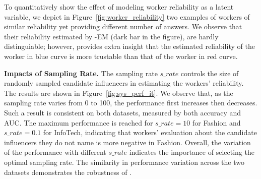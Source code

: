 To quantitatively show the effect of modeling worker reliability as a latent variable, we depict in Figure~\ref{fig:worker_reliability} two examples of workers of similar reliability yet providing different number of answers. We observe that their reliability estimated by \sys-EM (dark bar in the figure), are hardly distinguiable; however, \sys provides extra insight that the estimated reliability of the worker in blue curve is more trustable than that of the worker in red curve.




\smallskip
\noindent\textbf{Impacts of Sampling Rate.}
The sampling rate $s\_rate$ controls the size of randomly sampled candidate influencers in estimating the workers' reliability. The results are shown in Figure~\ref{fig:sys_perf_it}. We observe that, as the sampling rate varies from 0 to 100, the performance first increases then decreases. Such a result is consistent on both datasets, measured by both accuracy and AUC. The maximum performance is reached for $s\_rate= 10$ for Fashion and $s\_rate= 0.1$ for InfoTech, indicating that workers' evaluation about the candidate influencers they do not name is more negative in Fashion. Overall, the variation of the performance with different $s\_rate$ indicates the importance of selecting the optimal sampling rate. The similarity in performance variation across the two datasets demonstrates the robustness of \sys.

